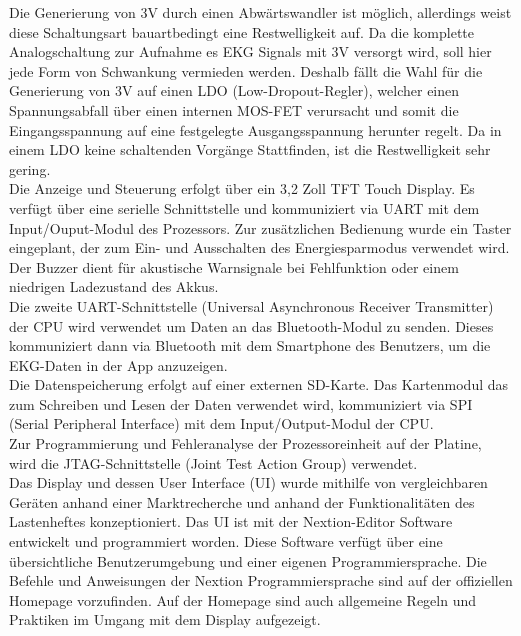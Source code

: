 Die Generierung von 3V durch einen Abwärtswandler ist möglich, allerdings weist diese Schaltungsart bauartbedingt eine Restwelligkeit auf. Da die komplette Analogschaltung zur Aufnahme es EKG Signals mit 3V versorgt wird, soll hier jede Form von Schwankung vermieden werden.
Deshalb fällt die Wahl für die Generierung von 3V auf einen LDO (Low-Dropout-Regler), welcher einen Spannungsabfall über einen internen MOS-FET verursacht und somit die Eingangsspannung auf eine festgelegte Ausgangsspannung herunter regelt. Da in einem LDO keine schaltenden Vorgänge Stattfinden, ist die Restwelligkeit sehr gering.\\

Die Anzeige und Steuerung erfolgt über ein 3,2 Zoll TFT Touch Display. Es verfügt über eine serielle Schnittstelle und kommuniziert via UART mit dem Input/Ouput-Modul des Prozessors. Zur zusätzlichen Bedienung wurde ein Taster eingeplant, der zum Ein- und Ausschalten des Energiesparmodus verwendet wird. Der Buzzer dient für akustische Warnsignale bei Fehlfunktion oder einem niedrigen Ladezustand des Akkus.\\

Die zweite UART-Schnittstelle (Universal Asynchronous Receiver Transmitter) der CPU wird verwendet um Daten an das Bluetooth-Modul zu senden. Dieses kommuniziert dann via Bluetooth mit dem Smartphone des Benutzers, um die EKG-Daten in der App anzuzeigen.\\

Die Datenspeicherung erfolgt auf einer externen SD-Karte. Das Kartenmodul das zum Schreiben und Lesen der Daten verwendet wird, kommuniziert via SPI (Serial Peripheral Interface) mit dem Input/Output-Modul der CPU.\\

Zur Programmierung und Fehleranalyse der Prozessoreinheit auf der Platine, wird die JTAG-Schnittstelle (Joint Test Action Group) verwendet.\\

Das Display und dessen User Interface (UI) wurde mithilfe von vergleichbaren Geräten anhand einer Marktrecherche und anhand der Funktionalitäten des Lastenheftes konzeptioniert. Das UI ist mit der Nextion-Editor Software entwickelt und programmiert worden. Diese Software verfügt über eine übersichtliche Benutzerumgebung und einer eigenen Programmiersprache. Die Befehle und Anweisungen der Nextion Programmiersprache sind auf der offiziellen Homepage vorzufinden. Auf der Homepage sind auch allgemeine Regeln und Praktiken im Umgang mit dem Display aufgezeigt.
\\


